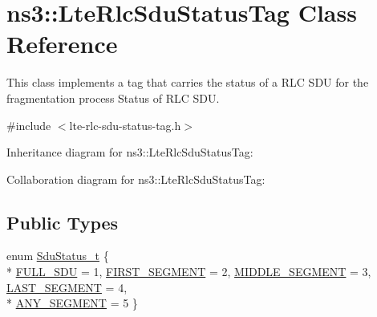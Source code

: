 \hypertarget{classns3_1_1LteRlcSduStatusTag}{}\section{ns3\+:\+:Lte\+Rlc\+Sdu\+Status\+Tag Class Reference}
\label{classns3_1_1LteRlcSduStatusTag}


This class implements a tag that carries the status of a R\+LC S\+DU for the fragmentation process Status of R\+LC S\+DU.  




{\ttfamily \#include $<$lte-\/rlc-\/sdu-\/status-\/tag.\+h$>$}



Inheritance diagram for ns3\+:\+:Lte\+Rlc\+Sdu\+Status\+Tag\+:


Collaboration diagram for ns3\+:\+:Lte\+Rlc\+Sdu\+Status\+Tag\+:
\subsection*{Public Types}
\begin{DoxyCompactItemize}
\item 
enum \hyperlink{classns3_1_1LteRlcSduStatusTag_ae7822c5cc0d54a3d193b09a91ed6f133}{Sdu\+Status\+\_\+t} \{ \\*
\hyperlink{classns3_1_1LteRlcSduStatusTag_ae7822c5cc0d54a3d193b09a91ed6f133ade41b0025c66cd211e992196f314d4a5}{F\+U\+L\+L\+\_\+\+S\+DU} = 1, 
\hyperlink{classns3_1_1LteRlcSduStatusTag_ae7822c5cc0d54a3d193b09a91ed6f133afda65e6233ba6fd1cd8aacf54cd11269}{F\+I\+R\+S\+T\+\_\+\+S\+E\+G\+M\+E\+NT} = 2, 
\hyperlink{classns3_1_1LteRlcSduStatusTag_ae7822c5cc0d54a3d193b09a91ed6f133a37a54694d337625c0c8541e3008d1d64}{M\+I\+D\+D\+L\+E\+\_\+\+S\+E\+G\+M\+E\+NT} = 3, 
\hyperlink{classns3_1_1LteRlcSduStatusTag_ae7822c5cc0d54a3d193b09a91ed6f133a4e59540a0a5c4530b61e4feda355be7b}{L\+A\+S\+T\+\_\+\+S\+E\+G\+M\+E\+NT} = 4, 
\\*
\hyperlink{classns3_1_1LteRlcSduStatusTag_ae7822c5cc0d54a3d193b09a91ed6f133a384301a5eb1fe1db7f0b2625a1223733}{A\+N\+Y\+\_\+\+S\+E\+G\+M\+E\+NT} = 5
 \}
\end{DoxyCompactItemize}

